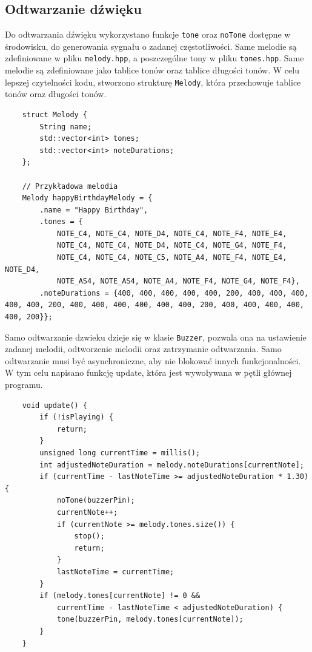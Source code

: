 \documentclass[../main.tex]{subfiles}
\begin{document}
\subsection{Odtwarzanie dźwięku}
Do odtwarzania dźwięku wykorzystano funkcje \texttt{tone} oraz \texttt{noTone} dostępne w środowisku, do generowania sygnału o zadanej częstotliwości.
Same melodie są zdefiniowane w pliku \texttt{melody.hpp}, a poszczególne tony w pliku \texttt{tones.hpp}. Same melodie są zdefiniowane jako tablice tonów oraz tablice długości tonów.
W celu lepszej czytelności kodu, stworzono strukturę \texttt{Melody}, która przechowuje tablice tonów oraz długości tonów.

\begin{verbatim}
    struct Melody {
        String name;
        std::vector<int> tones;
        std::vector<int> noteDurations;
    };
    
    // Przykładowa melodia
    Melody happyBirthdayMelody = {
        .name = "Happy Birthday",
        .tones = {
            NOTE_C4, NOTE_C4, NOTE_D4, NOTE_C4, NOTE_F4, NOTE_E4,
            NOTE_C4, NOTE_C4, NOTE_D4, NOTE_C4, NOTE_G4, NOTE_F4,
            NOTE_C4, NOTE_C4, NOTE_C5, NOTE_A4, NOTE_F4, NOTE_E4, NOTE_D4,
            NOTE_AS4, NOTE_AS4, NOTE_A4, NOTE_F4, NOTE_G4, NOTE_F4},
        .noteDurations = {400, 400, 400, 400, 400, 200, 400, 400, 400, 400, 400, 200, 400, 400, 400, 400, 400, 400, 200, 400, 400, 400, 400, 400, 200}};
\end{verbatim}

Samo odtwarzanie dzwieku dzieje się w klasie \texttt{Buzzer}, pozwala ona na ustawienie zadanej melodii, odtworzenie melodii oraz zatrzymanie odtwarzania.
Samo odtwarzanie musi być asynchroniczne, aby nie blokować innych funkcjonalności. 
W tym celu napisano funkcję update, która jest wywoływana w pętli głównej programu.

\begin{verbatim}
    void update() {
        if (!isPlaying) {
            return;
        }
        unsigned long currentTime = millis();
        int adjustedNoteDuration = melody.noteDurations[currentNote];
        if (currentTime - lastNoteTime >= adjustedNoteDuration * 1.30) {
            noTone(buzzerPin);
            currentNote++;
            if (currentNote >= melody.tones.size()) {
                stop();
                return;
            }
            lastNoteTime = currentTime;
        }
        if (melody.tones[currentNote] != 0 &&
            currentTime - lastNoteTime < adjustedNoteDuration) {
            tone(buzzerPin, melody.tones[currentNote]);
        }
    }
\end{verbatim}
\end{document}
